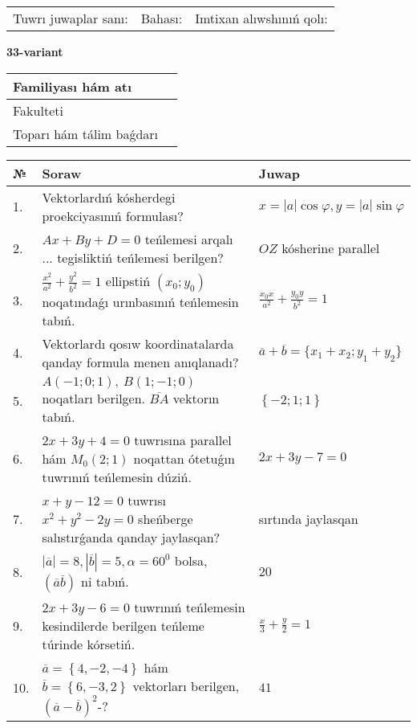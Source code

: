 \documentclass{article}
\begin{document}
\vspace{1cm}

\begin{tabular}{lll}
Tuwrı juwaplar sanı: \underline{\hspace{1.5cm}} & 
Bahası: \underline{\hspace{1.5cm}} & 
Imtixan alıwshınıń qolı: \underline{\hspace{2cm}} \\
\end{tabular}

\egroup

\newpage


\textbf{33-variant}\\

\bgroup
\def\arraystretch{1.6} %

\begin{tabular}{|m{5.7cm}|m{9.5cm}|}
\hline
Familiyası hám atı & \\
\hline
Fakulteti  & \\
\hline
Toparı hám tálim baǵdarı  & \\
\hline
\end{tabular}

\vspace{1cm}

\begin{tabular}{|m{0.7cm}|m{10cm}|m{4cm}|}
\hline
№ & Soraw & Juwap \\
\hline
1. & Vektorlardıń kósherdegi proekciyasınıń formulası? & $x=|a|\cos\varphi, y=|a|\sin\varphi$ \\
\hline
2. & $Ax+By+D=0$ teńlemesi arqalı ... tegisliktiń teńlemesi berilgen? & $OZ$ kósherine parallel \\
\hline
3. & $\frac{x^2}{a^2}+\frac{y^2}{b^2}=1$ ellipstiń $(x_0;y_0)$ noqatındaǵı urınbasınıń teńlemesin tabıń. & $\frac{x_0x}{a^2}+\frac{y_0y}{b^2}=1$ \\
\hline
4. & Vektorlardı qosıw koordinatalarda qanday formula menen anıqlanadı? & $\overline{a}+\overline{b}=\{x_1+x_2;y_1+y_2\}$ \\
\hline
5. & $A (-1;0;1),\ B (1;-1;0)$ noqatları berilgen. $\overline{BA}$ vektorın tabıń. & $\left\{ - 2;1;1 \right\}$ \\
\hline
6. & $2x+3y+4=0$ tuwrısına parallel hám $M_{0} (2;1)$ noqattan ótetuǵın tuwrınıń teńlemesin dúziń. & $2x+3y-7=0$ \\
\hline
7. & $x+y-12=0$ tuwrısı $x^{2}+y^{2}-2y=0$ sheńberge salıstırǵanda qanday jaylasqan? & sırtında jaylasqan \\
\hline
8. & $\left| \overline{a} \right|=8, \left| \overline{b} \right|=5, \alpha=60^{0}$ bolsa, $( \overline{a}\overline{b} )$ ni tabıń. & $20$ \\
\hline
9. & $2x+3y-6=0$ tuwrınıń teńlemesin kesindilerde berilgen teńleme túrinde kórsetiń. & $\frac{x}{3} + \frac{ y }{ 2 } =  1$ \\
\hline
10. & $\overline{a}=\left\{ 4,-2,-4 \right\}$ hám $\overline{b}=\left\{ 6,-3, 2 \right\}$ vektorları berilgen, $(\overline{a}-\overline{b}) ^{2}$-? & $41$ \\
\hline
\end{tabular}
\end{document}

